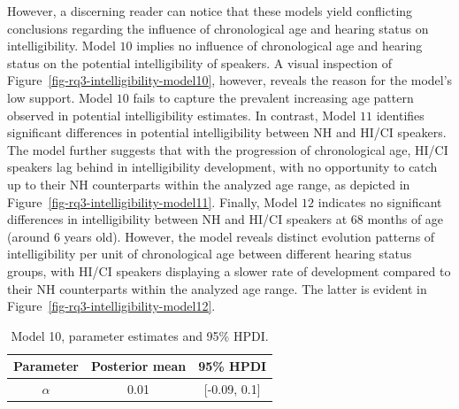 \documentclass[
  authoryear,
  preprint,
  1p]{elsarticle}
\begin{document}
However, a discerning reader can notice that these models yield
conflicting conclusions regarding the influence of chronological age and
hearing status on intelligibility. Model \(10\) implies no influence of
chronological age and hearing status on the potential intelligibility of
speakers. A visual inspection of
Figure~\ref{fig-rq3-intelligibility-model10}, however, reveals the
reason for the model's low support. Model \(10\) fails to capture the
prevalent increasing age pattern observed in potential intelligibility
estimates. In contrast, Model \(11\) identifies significant differences
in potential intelligibility between NH and HI/CI speakers. The model
further suggests that with the progression of chronological age, HI/CI
speakers lag behind in intelligibility development, with no opportunity
to catch up to their NH counterparts within the analyzed age range, as
depicted in Figure~\ref{fig-rq3-intelligibility-model11}. Finally, Model
\(12\) indicates no significant differences in intelligibility between
NH and HI/CI speakers at \(68\) months of age (around \(6\) years old).
However, the model reveals distinct evolution patterns of
intelligibility per unit of chronological age between different hearing
status groups, with HI/CI speakers displaying a slower rate of
development compared to their NH counterparts within the analyzed age
range. The latter is evident in
Figure~\ref{fig-rq3-intelligibility-model12}.

\begin{longtable}[]{@{}ccc@{}}

\caption{\label{tbl-parameter-model10}{Model 10, parameter estimates and
95\% HPDI.}}

\tabularnewline

\toprule\noalign{}
Parameter & Posterior mean & 95\% HPDI \\
\midrule\noalign{}
\endhead
\bottomrule\noalign{}
\endlastfoot
\(\alpha\) & 0.01 & {[}-0.09, 0.1{]} \\

\end{longtable}
\end{document}
